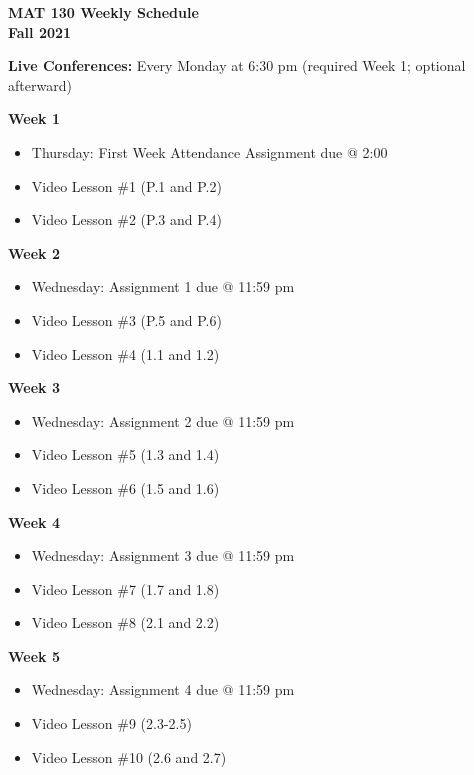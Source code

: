 \documentclass[12pt]{letter}
\author{Jacob Ayers}
\newcommand{\?}{\stackrel{?}{=}}
\begin{document}
	
	\begin{center}
		\textbf{MAT 130 Weekly Schedule \\ Fall 2021}
	\end{center}
	\textbf{Live Conferences:} Every Monday at 6:30 pm (required Week 1; optional afterward)
	
	\textbf{Week 1} \begin{itemize} \vspace{-12pt}
		\item Thursday: First Week Attendance Assignment due @ 2:00
		\item Video Lesson \#1 (P.1 and P.2)
		\item Video Lesson \#2 (P.3 and P.4)
	\end{itemize}

	\textbf{Week 2} \begin{itemize} \vspace{-12pt}
		\item Wednesday: Assignment 1 due @ 11:59 pm
		\item Video Lesson \#3 (P.5 and P.6)
		\item Video Lesson \#4 (1.1 and 1.2)
	\end{itemize}

	\textbf{Week 3} \begin{itemize} \vspace{-12pt}
		\item Wednesday: Assignment 2 due @ 11:59 pm
		\item Video Lesson \#5 (1.3 and 1.4)
		\item Video Lesson \#6 (1.5 and 1.6)
	\end{itemize}

	\textbf{Week 4} \begin{itemize} \vspace{-12pt}
		\item Wednesday: Assignment 3 due @ 11:59 pm
		\item Video Lesson \#7 (1.7 and 1.8)
		\item Video Lesson \#8 (2.1 and 2.2)
	\end{itemize}

	\textbf{Week 5} \begin{itemize} \vspace{-12pt}
		\item Wednesday: Assignment 4 due @ 11:59 pm
		\item Video Lesson \#9 (2.3-2.5)
		\item Video Lesson \#10 (2.6 and 2.7)
	\end{itemize}
\end{document}
